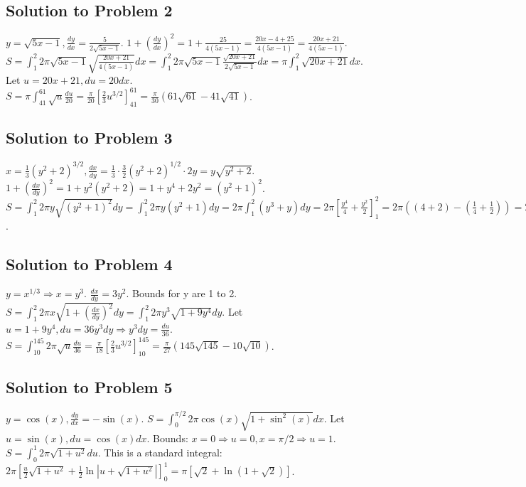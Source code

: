 \documentclass[12pt]{article}
\begin{document}
\subsection*{Solution to Problem 2}
$y=\sqrt{5x-1}, \frac{dy}{dx}=\frac{5}{2\sqrt{5x-1}}$. $1+(\frac{dy}{dx})^2 = 1+\frac{25}{4(5x-1)} = \frac{20x-4+25}{4(5x-1)} = \frac{20x+21}{4(5x-1)}$.
$S = \int_1^2 2\pi \sqrt{5x-1} \sqrt{\frac{20x+21}{4(5x-1)}} dx = \int_1^2 2\pi \sqrt{5x-1} \frac{\sqrt{20x+21}}{2\sqrt{5x-1}} dx = \pi \int_1^2 \sqrt{20x+21} dx$.
Let $u=20x+21, du=20dx$. $S = \pi \int_{41}^{61} \sqrt{u} \frac{du}{20} = \frac{\pi}{20} \left[\frac{2}{3}u^{3/2}\right]_{41}^{61} = \frac{\pi}{30}(61\sqrt{61}-41\sqrt{41})$.

\subsection*{Solution to Problem 3}
$x=\frac{1}{3}(y^2+2)^{3/2}, \frac{dx}{dy}=\frac{1}{3} \cdot \frac{3}{2}(y^2+2)^{1/2} \cdot 2y = y\sqrt{y^2+2}$.
$1+(\frac{dx}{dy})^2 = 1+y^2(y^2+2) = 1+y^4+2y^2 = (y^2+1)^2$.
$S = \int_1^2 2\pi y \sqrt{(y^2+1)^2} dy = \int_1^2 2\pi y(y^2+1) dy = 2\pi \int_1^2 (y^3+y) dy = 2\pi \left[\frac{y^4}{4}+\frac{y^2}{2}\right]_1^2 = 2\pi \left( (4+2) - (\frac{1}{4}+\frac{1}{2}) \right) = 2\pi(6-\frac{3}{4}) = \frac{21\pi}{2}$.

\subsection*{Solution to Problem 4}
$y=x^{1/3} \Rightarrow x=y^3$. $\frac{dx}{dy}=3y^2$. Bounds for y are 1 to 2.
$S = \int_1^2 2\pi x \sqrt{1+(\frac{dx}{dy})^2} dy = \int_1^2 2\pi y^3 \sqrt{1+9y^4} dy$.
Let $u=1+9y^4, du=36y^3 dy \Rightarrow y^3 dy = \frac{du}{36}$.
$S = \int_{10}^{145} 2\pi \sqrt{u} \frac{du}{36} = \frac{\pi}{18} \left[\frac{2}{3}u^{3/2}\right]_{10}^{145} = \frac{\pi}{27}(145\sqrt{145}-10\sqrt{10})$.

\subsection*{Solution to Problem 5}
$y=\cos(x), \frac{dy}{dx}=-\sin(x)$. $S = \int_0^{\pi/2} 2\pi \cos(x) \sqrt{1+\sin^2(x)} dx$.
Let $u=\sin(x), du=\cos(x) dx$. Bounds: $x=0 \Rightarrow u=0, x=\pi/2 \Rightarrow u=1$.
$S = \int_0^1 2\pi \sqrt{1+u^2} du$. This is a standard integral: $2\pi \left[\frac{u}{2}\sqrt{1+u^2} + \frac{1}{2}\ln|u+\sqrt{1+u^2}|\right]_0^1 = \pi[\sqrt{2}+\ln(1+\sqrt{2})]$.
\end{document}
